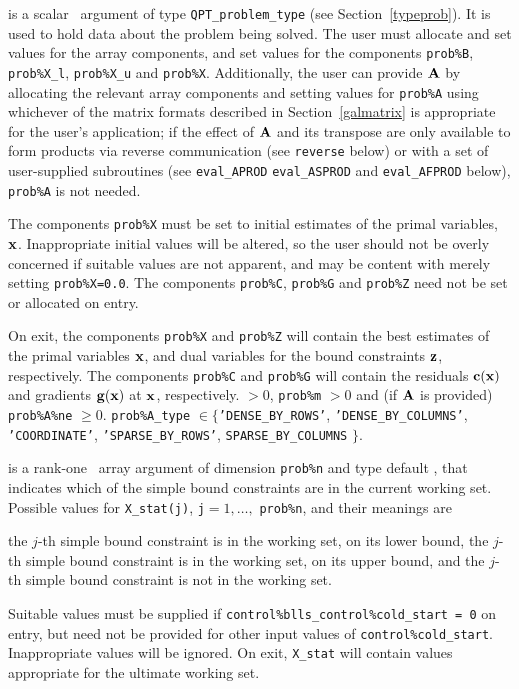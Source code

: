 \documentclass{galahad}
\begin{document}
\vspace*{-3mm}
\begin{description}
 is a scalar \intentinout\ argument of type
{\tt QPT\_problem\_type}
(see Section~\ref{typeprob}).
It is used to hold data about the problem being solved.
The user must allocate and set values for the array components,
and set values for the components
{\tt prob\%B}, {\tt prob\%X\_l}, {\tt prob\%X\_u} and {\tt prob\%X}.
Additionally, the user can provide ${\mathbf{A}}$ by allocating the
relevant array components and setting values for {\tt prob\%A}
using whichever
of the matrix formats described in Section~\ref{galmatrix}
is appropriate for the user's application;
if the effect of ${\mathbf{A}}$ and its transpose are only available to form products
via reverse communication (see {\tt reverse} below)
or with a set of user-supplied subroutines (see {\tt eval\_APROD}
{\tt eval\_ASPROD} and {\tt eval\_AFPROD} below), {\tt prob\%A} is not needed.

The components {\tt prob\%X}
must be set to initial estimates of the primal variables, ${\mathbf{x}}$.
Inappropriate initial values will be altered, so the user should
not be overly concerned if suitable values are not apparent, and may be
content with merely setting {\tt prob\%X=0.0}.
The components {\tt prob\%C}, {\tt prob\%G} and {\tt prob\%Z}
need not be set or allocated on entry.

On exit, the components {\tt prob\%X} and {\tt prob\%Z}
will contain the best estimates of the primal variables ${\mathbf{x}}$,
and dual variables for the bound constraints ${\mathbf{z}}$, respectively.
The components {\tt prob\%C} and {\tt prob\%G}
will contain the residuals ${\mathbf{c}}({\mathbf{x}})$
and gradients ${\mathbf{g}}({\mathbf{x}})$ at ${\mathbf{x}}$, respectively.
 $> 0$, {\tt prob\%m} $> 0$
              and (if ${\mathbf{A}}$ is provided) {\tt prob\%A\%ne} $\geq 0$.
{\tt prob\%A\_type} $\in \{${\tt 'DENSE\_BY\_ROWS'}, {\tt 'DENSE\_BY\_COLUMNS'},
 {\tt 'COORDINATE'}, {\tt 'SPARSE\_BY\_\-ROWS'}, {\tt SPARSE\_BY\_COLUMNS}
$\}$.

 is a rank-one \intentinout\ array argument of dimension {\tt prob\%n}
and type default \integer, that indicates which of the simple bound
constraints are in the current working set. Possible values for
{\tt X\_stat(j)}, {\tt j}$=1, \ldots ,$ {\tt prob\%n}, and their meanings are
\begin{description}
 the $j$-th simple bound constraint
is in the working set, on its lower bound,
 the $j$-th simple bound constraint
is in the working set, on its upper bound, and
  the $j$-th simple bound constraint is not in the working set.
\end{description}
Suitable values must be supplied if
{\tt control\%blls\_control\%cold\_start = 0} on entry,
but need not be provided for other input values of {\tt control\%cold\_start}.
Inappropriate values will be ignored.
On exit, {\tt X\_stat} will contain values appropriate for the ultimate
working set.


\end{description}
\end{document}

